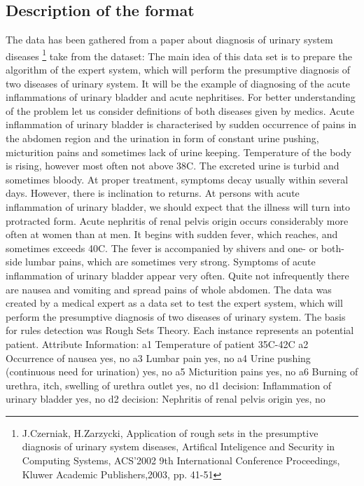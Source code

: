\documentclass[a4paper,twoside,11pt]{article}
\begin{document}
\subsection{Description of the format}
The data has been gathered from a paper about diagnosis of urinary system diseases \footnote{J.Czerniak, H.Zarzycki, Application of rough sets in the presumptive diagnosis of urinary system diseases, Artifical Inteligence and Security in Computing Systems, ACS'2002 9th International Conference Proceedings, Kluwer Academic Publishers,2003, pp. 41-51} \newline
take from the dataset: \newline
The main idea of this data set is to prepare the algorithm of the expert system, which will perform the presumptive diagnosis of two diseases of urinary system. It will be the example of diagnosing of the acute inflammations of urinary bladder and acute nephritises. For better understanding of the problem let us consider definitions of both diseases given by medics. Acute inflammation of urinary bladder is characterised by sudden occurrence of pains in the abdomen region and the urination in form of constant urine pushing, micturition pains and sometimes lack of urine keeping. Temperature of the body is rising, however most often not above 38C. The excreted urine is turbid and sometimes bloody. At proper treatment, symptoms decay usually within
several days. However, there is inclination to returns. At persons with acute inflammation of urinary bladder, we should expect that the illness will turn into protracted form. \newline
Acute nephritis of renal pelvis origin occurs considerably more often at women than at men. It begins with sudden fever, which reaches, and sometimes exceeds 40C. The fever is accompanied by shivers and one- or both-side lumbar pains, which are sometimes very strong. Symptoms of acute inflammation of urinary bladder appear very often. Quite not infrequently there are nausea and vomiting and spread pains of whole abdomen. \newline
The data was created by a medical expert as a data set to test the expert system, which will perform the presumptive diagnosis of two diseases of urinary system. The basis for rules detection was Rough Sets Theory. Each instance represents an potential patient. \newline
Attribute Information: \newline
a1 Temperature of patient { 35C-42C } \newline
a2 Occurrence of nausea { yes, no } \newline
a3 Lumbar pain { yes, no } \newline
a4 Urine pushing (continuous need for urination) { yes, no } \newline
a5 Micturition pains { yes, no } \newline
a6 Burning of urethra, itch, swelling of urethra outlet { yes, no } \newline
d1 decision: Inflammation of urinary bladder { yes, no } \newline
d2 decision: Nephritis of renal pelvis origin { yes, no } \newline
\end{document}

